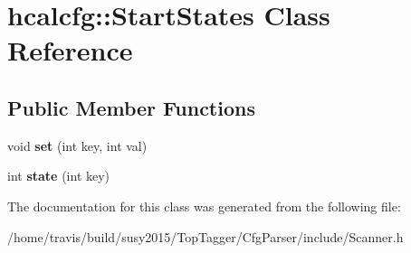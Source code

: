 \hypertarget{classhcalcfg_1_1StartStates}{\section{hcalcfg\-:\-:Start\-States Class Reference}
\label{classhcalcfg_1_1StartStates}
}
\subsection*{Public Member Functions}
\begin{DoxyCompactItemize}
\item 
\hypertarget{classhcalcfg_1_1StartStates_a64bf9a4476042f86c54bb77a9de6ac53}{void {\bfseries set} (int key, int val)}\label{classhcalcfg_1_1StartStates_a64bf9a4476042f86c54bb77a9de6ac53}

\item 
\hypertarget{classhcalcfg_1_1StartStates_a76c2847b9d374dbccdc3ee910a92bfdd}{int {\bfseries state} (int key)}\label{classhcalcfg_1_1StartStates_a76c2847b9d374dbccdc3ee910a92bfdd}

\end{DoxyCompactItemize}


The documentation for this class was generated from the following file\-:\begin{DoxyCompactItemize}
\item 
/home/travis/build/susy2015/\-Top\-Tagger/\-Cfg\-Parser/include/Scanner.\-h\end{DoxyCompactItemize}
